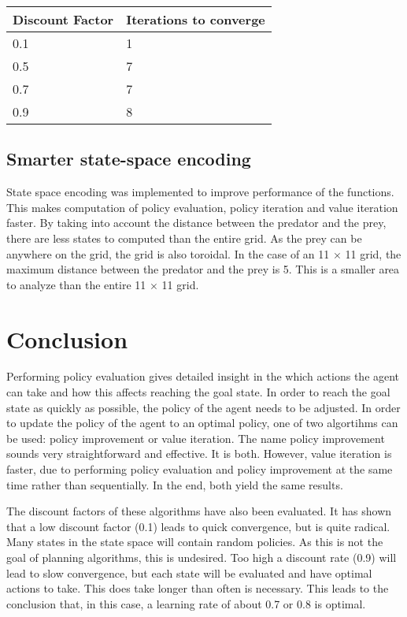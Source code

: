 \documentclass{article}
\begin{document}
\begin{center}
	\begin{tabular}{ l || l }
		Discount Factor & Iterations to converge \\ 
		\hline
		0.1 & 1 \\
		0.5 & 7 \\
		0.7 & 7 \\
		0.9 & 8 \\	
	\end{tabular}
\end{center}

\subsection*{Smarter state-space encoding}
State space encoding was implemented to improve performance of the functions. This makes computation of policy evaluation, policy iteration and value iteration faster. By taking into account the distance between the predator and the prey, there are less states to computed than the entire grid. As the prey can be anywhere on the grid, the grid is also toroidal. In the case of an 11 $\times$ 11 grid, the maximum distance between the predator and the prey is 5. This is a smaller area to analyze than the entire 11 $\times$ 11 grid.


\section*{Conclusion}
Performing policy evaluation gives detailed insight in the which actions the agent can take and how this affects reaching the goal state. In order to reach the goal state as quickly as possible, the policy of the agent needs to be adjusted. In order to update the policy of the agent to an optimal policy, one of two algortihms can be used: policy improvement or value iteration. The name policy improvement sounds very straightforward and effective. It is both. However, value iteration is faster, due to performing policy evaluation and policy improvement at the same time rather than sequentially. In the end, both yield the same results.

The discount factors of these algorithms have also been evaluated. It has shown that a low discount factor (0.1) leads to quick convergence, but is quite radical. Many states in the state space will contain random policies. As this is not the goal of planning algorithms, this is undesired. Too high a discount rate (0.9) will lead to slow convergence, but each state will be evaluated and have optimal actions to take. This does take longer than often is necessary. This leads to the conclusion that, in this case, a learning rate of about 0.7 or 0.8 is optimal.
\end{document}
